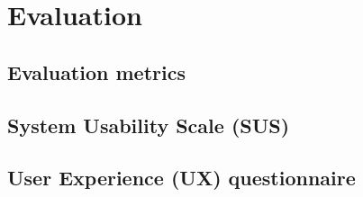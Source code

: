 \section{Evaluation}

\subsection{Evaluation metrics}

\subsection{System Usability Scale (SUS)}

\subsection{User Experience (UX) questionnaire}

